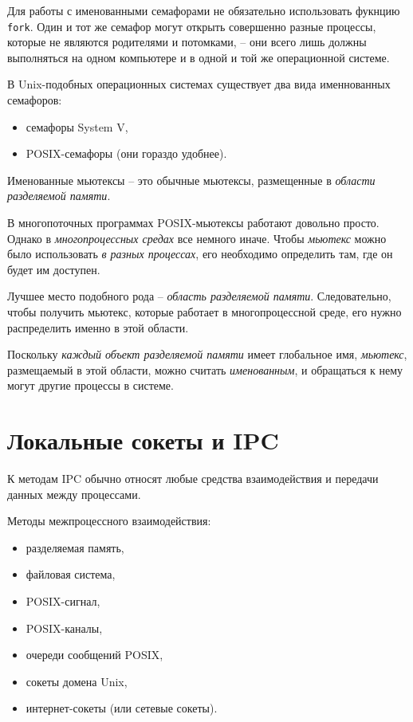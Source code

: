 \documentclass[%
	11pt,
	a4paper,
	utf8,
		]{article}
\begin{document}
Для работы с именованными семафорами не обязательно использовать фукнцию \verb|fork|. Один и тот же семафор могут открыть совершенно разные процессы, которые не являются родителями и потомками, -- они всего лишь должны выполняться на одном компьютере и в одной и той же операционной системе.

В Unix-подобных операционных системах существует два вида именнованных семафоров:
\begin{itemize}
	\item семафоры System V,
	
	\item POSIX-семафоры (они гораздо удобнее).
\end{itemize}

Именованные мьютексы -- это обычные мьютексы, размещенные в \emph{области разделяемой памяти}.

В многопоточных программах POSIX-мьютексы работают довольно просто. Однако в \emph{многопроцессных средах} все немного иначе. Чтобы \emph{мьютекс} можно было использовать \emph{в разных процессах}, его необходимо определить там, где он будет им доступен.

Лучшее место подобного рода -- \emph{область разделяемой памяти}. Следовательно, чтобы получить мьютекс, которые работает в многопроцессной среде, его нужно распределить именно в этой области.

Поскольку \emph{каждый объект разделяемой памяти} имеет глобальное имя, \emph{мьютекс}, размещаемый в этой области, можно считать \emph{именованным}, и обращаться к нему могут другие процессы в системе.

\section{Локальные сокеты и IPC}

К методам IPC обычно относят любые средства взаимодействия и передачи данных между процессами.

Методы межпроцессного взаимодействия:
\begin{itemize}
	\item разделяемая память,
	
	\item файловая система,
	
	\item POSIX-сигнал,
	
	\item POSIX-каналы,
	
	\item очереди сообщений POSIX,
	
	\item сокеты домена Unix,
	
	\item интернет-сокеты (или сетевые сокеты).
\end{itemize}
\end{document}
